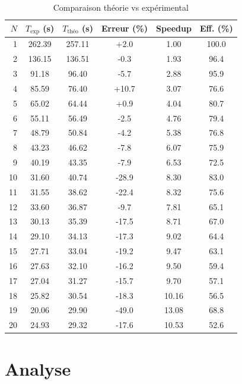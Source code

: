 \documentclass[11pt,a4paper]{article}
\begin{document}
\begin{table}[h]
\centering
\caption{Comparaison théorie vs expérimental}
\begin{tabular}{r S[round-precision=2] S[round-precision=2] S[round-precision=1] S[round-precision=2] S[round-precision=1]}
\toprule
{$N$} & {$T_{\exp}$ (s)} & {$T_{\text{théo}}$ (s)} & {Erreur (\%)} & {Speedup} & {Eff. (\%)} \\
 & 262.39 & 257.11 & +2.0 & 1.00 & 100.0 \\
2 & 136.15 & 136.51 & -0.3 & 1.93 & 96.4 \\
3 & 91.18 & 96.40 & -5.7 & 2.88 & 95.9 \\
4 & 85.59 & 76.40 & +10.7 & 3.07 & 76.6 \\
5 & 65.02 & 64.44 & +0.9 & 4.04 & 80.7 \\
6 & 55.11 & 56.49 & -2.5 & 4.76 & 79.4 \\
7 & 48.79 & 50.84 & -4.2 & 5.38 & 76.8 \\
8 & 43.23 & 46.62 & -7.8 & 6.07 & 75.9 \\
9 & 40.19 & 43.35 & -7.9 & 6.53 & 72.5 \\
10 & 31.60 & 40.74 & -28.9 & 8.30 & 83.0 \\
11 & 31.55 & 38.62 & -22.4 & 8.32 & 75.6 \\
12 & 33.60 & 36.87 & -9.7 & 7.81 & 65.1 \\
13 & 30.13 & 35.39 & -17.5 & 8.71 & 67.0 \\
14 & 29.10 & 34.13 & -17.3 & 9.02 & 64.4 \\
15 & 27.71 & 33.04 & -19.2 & 9.47 & 63.1 \\
16 & 27.63 & 32.10 & -16.2 & 9.50 & 59.4 \\
17 & 27.04 & 31.27 & -15.7 & 9.70 & 57.1 \\
18 & 25.82 & 30.54 & -18.3 & 10.16 & 56.5 \\
19 & 20.06 & 29.90 & -49.0 & 13.08 & 68.8 \\
20 & 24.93 & 29.32 & -17.6 & 10.53 & 52.6 \\
\bottomrule
\end{tabular}
\end{table}

\section{Analyse}
\end{document}
